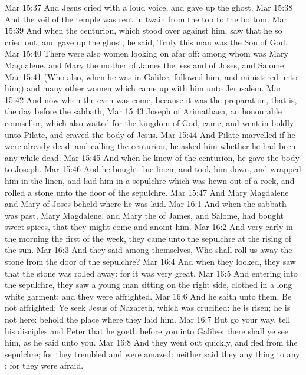 \vs Mar 15:37 And Jesus cried with a loud voice, and gave up the ghost.
\vs Mar 15:38 And the veil of the temple was rent in twain from the top to the bottom.
\vs Mar 15:39 And when the centurion, which stood over against him, saw that he so cried out, and gave up the ghost, he said, Truly this man was the Son of God.
\vs Mar 15:40 There were also women looking on afar off: among whom was Mary Magdalene, and Mary the mother of James the less and of Joses, and Salome;
\vs Mar 15:41 (Who also, when he was in Galilee, followed him, and ministered unto him;) and many other women which came up with him unto Jerusalem.
\vs Mar 15:42 And now when the even was come, because it was the preparation, that is, the day before the sabbath,
\vs Mar 15:43 Joseph of Arimathaea, an honourable counsellor, which also waited for the kingdom of God, came, and went in boldly unto Pilate, and craved the body of Jesus.
\vs Mar 15:44 And Pilate marvelled if he were already dead: and calling  the centurion, he asked him whether he had been any while dead.
\vs Mar 15:45 And when he knew  of the centurion, he gave the body to Joseph.
\vs Mar 15:46 And he bought fine linen, and took him down, and wrapped him in the linen, and laid him in a sepulchre which was hewn out of a rock, and rolled a stone unto the door of the sepulchre.
\vs Mar 15:47 And Mary Magdalene and Mary  of Joses beheld where he was laid.
\vs Mar 16:1 And when the sabbath was past, Mary Magdalene, and Mary the  of James, and Salome, had bought sweet spices, that they might come and anoint him.
\vs Mar 16:2 And very early in the morning the first  of the week, they came unto the sepulchre at the rising of the sun.
\vs Mar 16:3 And they said among themselves, Who shall roll us away the stone from the door of the sepulchre?
\vs Mar 16:4 And when they looked, they saw that the stone was rolled away: for it was very great.
\vs Mar 16:5 And entering into the sepulchre, they saw a young man sitting on the right side, clothed in a long white garment; and they were affrighted.
\vs Mar 16:6 And he saith unto them, Be not affrighted: Ye seek Jesus of Nazareth, which was crucified: he is risen; he is not here: behold the place where they laid him.
\vs Mar 16:7 But go your way, tell his disciples and Peter that he goeth before you into Galilee: there shall ye see him, as he said unto you.
\vs Mar 16:8 And they went out quickly, and fled from the sepulchre; for they trembled and were amazed: neither said they any thing to any ; for they were afraid.
